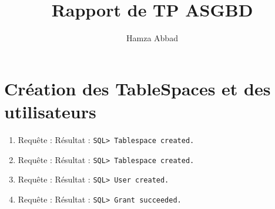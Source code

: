 \documentclass[12pt,a4paper]{article}
\author{Hamza Abbad}
\title{Rapport de TP ASGBD}
\begin{document}
\section{Création des TableSpaces et des utilisateurs}
	\begin{enumerate}
		\item Requête : 
			Résultat : \texttt{SQL> Tablespace created.}
		\item Requête : 
			Résultat : \texttt{SQL> Tablespace created.}
		\item Requête : 
			Résultat : \texttt{SQL> User created.}
		\item Requête : 
			Résultat : \texttt{SQL> Grant succeeded.}
	\end{enumerate}
\end{document}
